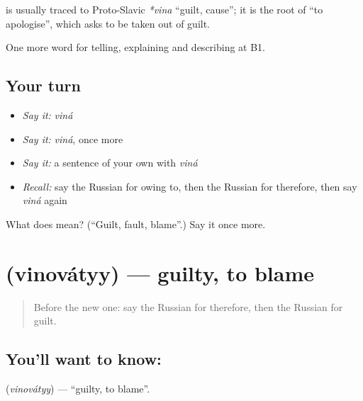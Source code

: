 \begin{cousinweb}
\textbf{} is usually traced to Proto-Slavic \emph{*vina} \textquotedblleft{}guilt, cause\textquotedblright{}; it is the root of \emph{} \textquotedblleft{}to apologise\textquotedblright{}, which asks to be taken out of guilt.
\end{cousinweb}

\begin{grammarlens}[title={What you've built}]
One more word for telling, explaining and describing at B1.
\end{grammarlens}

\subsection*{Your turn}
\begin{itemize}
\raggedright
  \item \emph{Say it:} \emph{viná}
  \item \emph{Say it:} \emph{viná}, once more
  \item \emph{Say it:} a sentence of your own with \emph{viná}
  \item \emph{Recall:} say the Russian for owing to, then the Russian for therefore, then say \emph{viná} again
\end{itemize}

\begin{tcolorbox}[breakable,colback=teal!4,colframe=teal!35!black,title={Before you move on}]
What does  mean? (\textquotedblleft{}Guilt, fault, blame\textquotedblright{}.) Say it once more.
\end{tcolorbox}
\section[\texorpdfstring{\ru{виноватый} (vinovátyy)}{виноватый (vinovátyy)}]{ (vinovátyy) — guilty, to blame}

\label{lesson:RU-C352-vinovatyy}



\begin{quote}
Before the new one: say the Russian for therefore, then the Russian for guilt.
\end{quote}

\subsection*{You'll want to know: }
\textbf{} (\emph{vinovátyy}) — \textquotedblleft{}guilty, to blame\textquotedblright{}.


